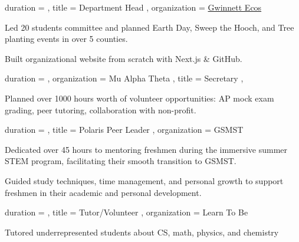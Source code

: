 \documentclass[sidebar-width=2in, primary=slate, linespace=1.2]{clean-resume}
\begin{document}
\begin{main}
    \begin{experience}
        {
            duration = {  },
            title = { Department Head },
            organization = { \href{https://gecos.org/}{Gwinnett Ecos} }
        }
        \item Led 20 students committee and planned Earth Day, Sweep the Hooch, and Tree planting events in over 5 counties.
        \item Built organizational website from scratch with Next.js \& GitHub.
    \end{experience}

    \begin{experience}
        {
            duration = {  },
            organization = { Mu Alpha Theta },
            title = { Secretary },
        }
        \item Planned over 1000 hours worth of volunteer opportunities: AP mock exam grading, peer tutoring, collaboration with non-profit. 
    \end{experience}
  \end{main}

  \newpage


    \begin{experience}
      {
        duration = {  },
        title = { Polaris Peer Leader },
        organization = { GSMST }
      }
      \item Dedicated over 45 hours to mentoring freshmen during the immersive summer STEM program, facilitating their smooth transition to GSMST.
      \item Guided study techniques, time management, and personal growth to support freshmen in their academic and personal development.
    \end{experience}
    
      \begin{experience}
      {
        duration = {  },
        title = { Tutor/Volunteer },
        organization = { Learn To Be }
      }
      \item Tutored underrepresented students about CS, math, physics, and chemistry
    \end{experience}
  
    
\end{document}
